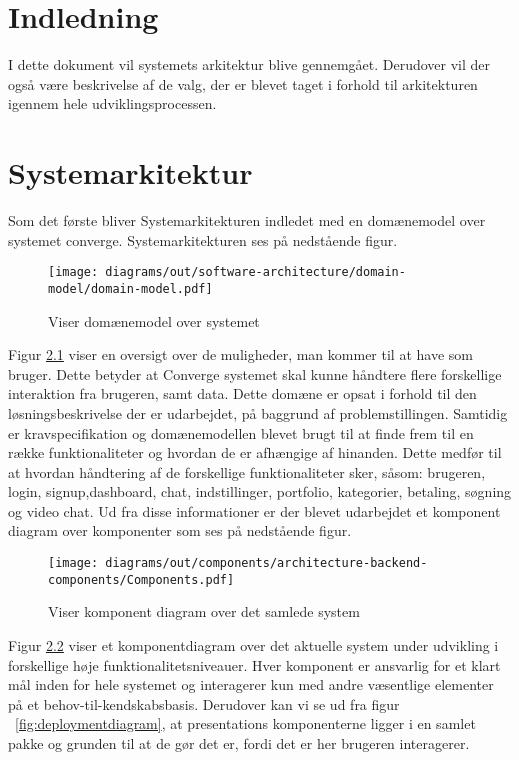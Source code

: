 
\chapter{Indledning}

I dette dokument vil systemets arkitektur blive gennemgået. 
Derudover vil der også være beskrivelse af de valg, der er blevet taget i forhold til arkitekturen igennem hele udviklingsprocessen. 
    
\chapter{Systemarkitektur}

Som det første bliver Systemarkitekturen indledet med en domænemodel over systemet converge. Systemarkitekturen ses på nedstående figur.

\begin{figure}[H]
    \centering
\texttt{[image: diagrams/out/software-architecture/domain-model/domain-model.pdf]}
\caption{Viser domænemodel over systemet}
\label{fig:domainmodel}
\end{figure}

Figur \ref{fig:domainmodel} viser en oversigt over de muligheder, man kommer til at have som bruger. Dette betyder at Converge systemet skal kunne håndtere flere forskellige interaktion fra brugeren, samt data. Dette domæne er opsat i forhold til den løsningsbeskrivelse der er udarbejdet, på baggrund af problemstillingen.
Samtidig er kravspecifikation og domænemodellen blevet brugt til at finde frem til en række funktionaliteter og hvordan de er afhængige af hinanden. Dette medfør til at hvordan håndtering af de forskellige funktionaliteter sker, såsom: brugeren, login, signup,dashboard, chat, indstillinger, portfolio, kategorier, betaling, søgning og video chat. Ud fra disse informationer er der blevet udarbejdet et komponent diagram over komponenter som ses på nedstående figur.

\begin{figure}[H]
    \centering
\texttt{[image: diagrams/out/components/architecture-backend-components/Components.pdf]}
\caption{Viser komponent diagram over det samlede system}
\label{fig:komponentdiagram}
\end{figure}

Figur \ref{fig:komponentdiagram} viser et komponentdiagram over det aktuelle system under udvikling i forskellige høje funktionalitetsniveauer. Hver komponent er ansvarlig for et klart mål inden for hele systemet og interagerer kun med andre væsentlige elementer på et behov-til-kendskabsbasis. Derudover kan vi se ud fra figur ~\ref{fig:deploymentdiagram}, at presentations komponenterne ligger i en samlet pakke og grunden til at de gør det er, fordi det er her brugeren interagerer.

